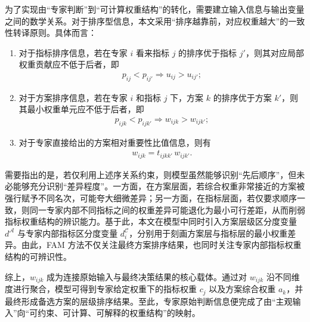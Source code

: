 \documentclass{article}
\begin{document}
为了实现由“专家判断”到“可计算权重结构”的转化，需要建立输入信息与输出变量之间的数学关系。对于排序型信息，本文采用“排序越靠前，对应权重越大”的一致性转译原则。具体而言：
\begin{enumerate}
    \item 对于指标排序信息，若在专家 $i$ 看来指标 $j$ 的排序优于指标 $j'$，则其对应局部权重贡献应不低于后者，即
    \begin{align}
        p_{ij}<p_{ij'} \Longrightarrow u_{ij}>u_{ij'};
    \end{align}

    \item 对于方案排序信息，若在专家 $i$ 和指标 $j$ 下，方案 $k$ 的排序优于方案 $k'$，则其最小权重单元应不低于后者，即
    \begin{align}
        p_{ijk}<p_{ijk'} \Longrightarrow w_{ijk}>w_{ijk'};
    \end{align}

    \item 对于专家直接给出的方案相对重要性比值信息，则有
    \begin{align}
        w_{ijk}=t_{ijkk'}\,w_{ijk'}.
    \end{align}
\end{enumerate}

需要指出的是，若仅利用上述序关系约束，则模型虽然能够识别“先后顺序”，但未必能够充分识别“差异程度”。一方面，在方案层面，若综合权重非常接近的方案被强行赋予不同名次，可能夸大细微差异；另一方面，在指标层面，若仅要求顺序一致，则同一专家内部不同指标之间的权重差异可能退化为最小可行差距，从而削弱指标权重结构的辨识能力。基于此，本文在模型中同时引入方案层级区分度变量 $d^{\mathcal A}$ 与专家内部指标区分度变量 $d_i^{\mathcal C}$，分别用于刻画方案层与指标层的最小权重差异。由此，FAM 方法不仅关注最终方案排序结果，也同时关注专家内部指标权重结构的可辨识性。

综上，$w_{ijk}$ 成为连接原始输入与最终决策结果的核心载体。通过对 $w_{ijk}$ 沿不同维度进行聚合，模型可得到专家给定权重下的指标权重 $c_j$ 以及方案综合权重 $a_k$，并最终形成备选方案的层级排序结果。至此，专家原始判断信息便完成了由“主观输入”向“可约束、可计算、可解释的权重结构”的映射。
\end{document}
